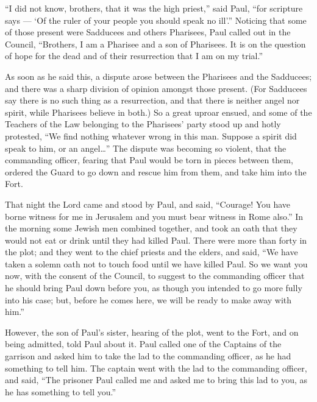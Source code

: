  ``I did not know, brothers, that it was the high priest,''
said Paul, ``for scripture says --- `Of the ruler of your people you
should speak no ill'.''  Noticing that some of those present
were Sadducees and others Pharisees, Paul called out in the Council,
``Brothers, I am a Pharisee and a son of Pharisees. It is on the
question of hope for the dead and of their resurrection that I am on my
trial.''

 As soon as he said this, a dispute arose between the
Pharisees and the Sadducees; and there was a sharp division of opinion
amongst those present.  (For Sadducees say there is no such
thing as a resurrection, and that there is neither angel nor spirit,
while Pharisees believe in both.)  So a great uproar ensued,
and some of the Teachers of the Law belonging to the Pharisees' party
stood up and hotly protested, ``We find nothing whatever wrong in this
man. Suppose a spirit did speak to him, or an angel\ldots{}''
 The dispute was becoming so violent, that the commanding
officer, fearing that Paul would be torn in pieces between them, ordered
the Guard to go down and rescue him from them, and take him into the
Fort.

 That night the Lord came and stood by Paul, and said,
``Courage! You have borne witness for me in Jerusalem and you must bear
witness in Rome also.''  In the morning some Jewish men
combined together, and took an oath that they would not eat or drink
until they had killed Paul.  There were more than forty in
the plot;  and they went to the chief priests and the
elders, and said, ``We have taken a solemn oath not to touch food until
we have killed Paul.  So we want you now, with the consent
of the Council, to suggest to the commanding officer that he should
bring Paul down before you, as though you intended to go more fully into
his case; but, before he comes here, we will be ready to make away with
him.''

 However, the son of Paul's sister, hearing of the plot,
went to the Fort, and on being admitted, told Paul about it.
 Paul called one of the Captains of the garrison and asked
him to take the lad to the commanding officer, as he had something to
tell him.  The captain went with the lad to the commanding
officer, and said, ``The prisoner Paul called me and asked me to bring
this lad to you, as he has something to tell you.''

